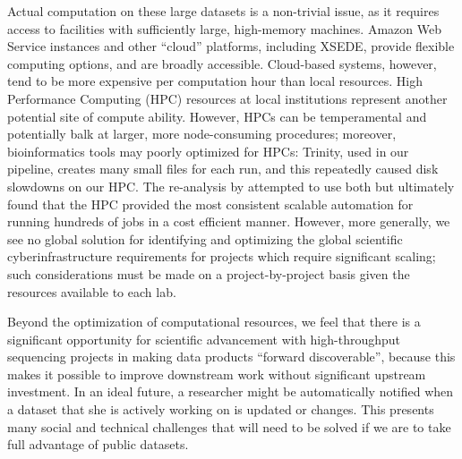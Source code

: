 \documentclass[a4paper,num-refs]{oup-contemporary}
\begin{document}
Actual computation on these large datasets is a non-trivial issue, as
it requires access to facilities with sufficiently large, high-memory
machines.  Amazon Web Service instances and other ``cloud'' platforms,
including XSEDE, provide flexible computing options, and are broadly
accessible. Cloud-based systems, however, tend to be more expensive
per computation hour than local resources. High Performance Computing
(HPC) resources at local institutions represent another potential site
of compute ability.  However, HPCs can be temperamental and
potentially balk at larger, more node-consuming procedures; moreover,
bioinformatics tools may poorly optimized for HPCs: Trinity, used in
our pipeline, creates many small files for each run, and this
repeatedly caused disk slowdowns on our HPC.  The re-analysis by
\citet{Johnson2018} attempted to use both but ultimately
found that the HPC provided the most consistent scalable automation
for running hundreds of jobs in a cost efficient manner.  However,
more generally, we see no global solution for identifying and
optimizing the global scientific cyberinfrastructure requirements for
projects which require significant scaling; such considerations must
be made on a project-by-project basis given the resources available to
each lab.

Beyond the optimization of computational resources, we feel that there
is a significant opportunity for scientific advancement with
high-throughput sequencing projects in making data products ``forward
discoverable'', because this makes it possible to improve downstream
work without significant upstream investment.  In an ideal future, a
researcher might be automatically notified when a dataset that she is
actively working on is updated or changes. This presents many social
and technical challenges that will need to be solved if we are to take
full advantage of public datasets.
\end{document}
